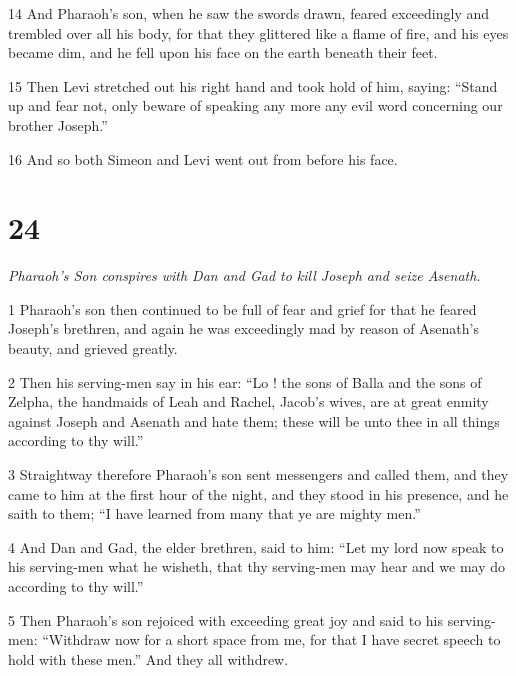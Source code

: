 \par 14 And Pharaoh's son, when he saw the swords drawn, feared exceedingly and trembled over all his body, for that they glittered like a flame of fire, and his eyes became dim, and he fell upon his face on the earth beneath their feet. 

\par 15 Then Levi stretched out his right hand and took hold of him, saying: “Stand up and fear not, only beware of speaking any more any evil word concerning our brother Joseph.” 

\par 16 And so both Simeon and Levi went out from before his face. 

\chapter{24}

\par \textit{Pharaoh's Son conspires with Dan and Gad to kill Joseph and seize Asenath.}


\par 1 Pharaoh's son then continued to be full of fear and grief for that he feared Joseph's brethren, and again he was exceedingly mad by reason of Asenath's beauty, and grieved greatly. 

\par 2 Then his serving-men say in his ear: “Lo ! the sons of Balla and the sons of Zelpha, the handmaids of Leah and Rachel, Jacob's wives, are at great enmity against Joseph and Asenath and hate them; these will be unto thee in all things according to thy will.” 

\par 3 Straightway therefore Pharaoh's son sent messengers and called them, and they came to him at the first hour of the night, and they stood in his presence, and he saith to them; “I have learned from many that ye are mighty men.” 

\par 4 And Dan and Gad, the elder brethren, said to him: “Let my lord now speak to his serving-men what he wisheth, that thy serving-men may hear and we may do according to thy will.” 

\par 5 Then Pharaoh's son rejoiced with exceeding great joy and said to his serving-men: “Withdraw now for a short space from me, for that I have secret speech to hold with these men.” And they all withdrew. 

